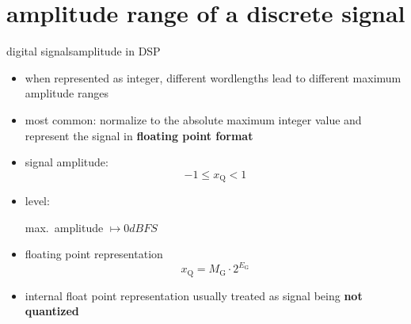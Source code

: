     \section[amplitude range]{amplitude range of a discrete signal}
        \begin{frame}{digital signals}{amplitude in DSP}
            \begin{itemize}
                \item<1->   when represented as integer, different wordlengths lead to different maximum amplitude ranges
                \item<2->	most common: normalize to the absolute maximum integer value and represent the signal in \textbf{floating point format}
                \item<3->[$\Rightarrow$]   signal amplitude:
                    \begin{equation*}
                        -1 \leq x_{\mathrm{Q}} < 1
                    \end{equation*}
                \item<3->[$\Rightarrow$]	level: \\
                    \begin{center}max.\ amplitude $\mapsto \unit{0}{dBFS}$\end{center}
                \item<4->   floating point representation
                    \begin{equation*}
                        x_{\mathrm{Q}} = M_{\mathrm{G}}\cdot 2^{E_{\mathrm{G}}}
                    \end{equation*}
                \item<5->   internal float point representation usually treated as signal being \textbf{not quantized}
            \end{itemize}
        \end{frame}

